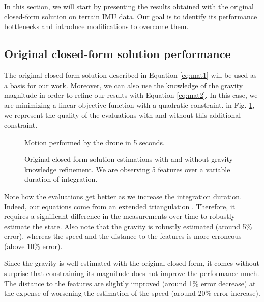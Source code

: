 \documentclass[letterpaper, 10 pt, conference]{ieeeconf}  %
\begin{document}
In this section, we will start by presenting the results obtained with the original closed-form solution on terrain IMU data.
Our goal is to identify its performance bottlenecks and introduce modifications to overcome them.


\subsection{Original closed-form solution performance}

The original closed-form solution described in Equation \ref{eq:mat1} will be used as a basis for our work.
Moreover, we can also use the knowledge of the gravity magnitude in order to refine our results with Equation \ref{eq:mat2}.
In this case, we are minimizing a linear objective function with a quadratic constraint.
in Fig. \ref{fig:original}, we represent the quality of the evaluations with and without this additional constraint.


\begin{figure}
  \centering
    \resizebox{0.6\columnwidth}{!}{}
    \caption{Motion performed by the drone in 5 seconds.}
\end{figure}

\begin{figure}
  \centering
    \resizebox{0.7\columnwidth}{!}{}
    \caption{Original closed-form solution estimations with and without gravity knowledge refinement. We are observing 5 features  over a variable duration of integration.\label{fig:original}}
\end{figure}


Note how the evaluations get better as we increase the integration duration.
Indeed, our equations come from an extended triangulation \cite{Martinelli2012}.
Therefore, it requires a significant difference in the measurements over time to robustly estimate the state.
Also note that the gravity is robustly estimated (around 5\% error), whereas the speed and the distance to the features is more erroneous (above 10\% error).

Since the gravity is well estimated with the original closed-form, it comes without surprise that constraining its magnitude does not improve the performance much.
The distance to the features are slightly improved (around 1\% error decrease) at the expense of worsening the estimation of the speed (around 20\% error increase).
\end{document}
